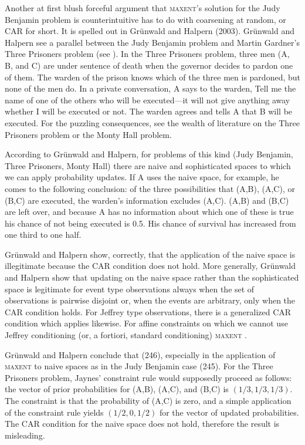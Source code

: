 \documentclass[12pt]{article}
\begin{document}
\bigskip

\bigskip

\nias Another at first blush forceful argument that \textsc{maxent}'s
solution for the Judy Benjamin problem is counterintuitive has to do
with coarsening at random, or CAR for short. It is spelled out in
Gr{\"u}nwald and Halpern (2003)\nonsc{}. Gr{\"u}nwald and Halpern see
a parallel between the Judy Benjamin problem and Martin Gardner's
Three Prisoners problem (see ). In the Three
Prisoners problem, three men (A, B, and C) are under sentence of death
when the governor decides to pardon one of them. The warden of the
prison knows which of the three men is pardoned, but none of the men
do. In a private conversation, A says to the warden, Tell me the name
of one of the others who will be executed---it will not give anything
away whether I will be executed or not. The warden agrees and tells A
that B will be executed. For the puzzling consequences, see the wealth
of literature on the Three Prisoners problem or the Monty Hall
problem.

According to Gr{\"u}nwald and Halpern, for problems of this kind (Judy
Benjamin, Three Prisoners, Monty Hall) there are naive and
sophisticated spaces to which we can apply probability updates. If A
uses the naive space, for example, he comes to the following
conclusion: of the three possibilities that (A,B), (A,C), or (B,C) are
executed, the warden's information excludes (A,C). (A,B) and (B,C) are
left over, and because A has no information about which one of these
is true his chance of not being executed is 0.5. His chance of
survival has increased from one third to one half. 

Gr{\"u}nwald and Halpern show, correctly, that the application of the
naive space is illegitimate because the CAR condition does not hold.
More generally, Gr{\"u}nwald and Halpern show that updating on the
naive space rather than the sophisticated space is legitimate for
event type observations always when the set of observations is
pairwise disjoint or, when the events are arbitrary, only when the CAR
condition holds. For Jeffrey type observations, there is a generalized
CAR condition which applies likewise. For affine constraints on which
we cannot use Jeffrey conditioning (or, a fortiori, standard
conditioning) \textsc{maxent } .

Gr{\"u}nwald and Halpern conclude that  (246), especially in the application of
\textsc{maxent} to naive spaces as in the Judy Benjamin case
 (245). For the Three Prisoners problem,
Jaynes' constraint rule would supposedly proceed as follows: the
vector of prior probabilities for (A,B), (A,C), and (B,C) is
$(1/3,1/3,1/3)$. The constraint is that the probability of (A,C) is
zero, and a simple application of the constraint rule yields
$(1/2,0,1/2)$ for the vector of updated probabilities. The CAR
condition for the naive space does not hold, therefore the result is
misleading.
\end{document}
